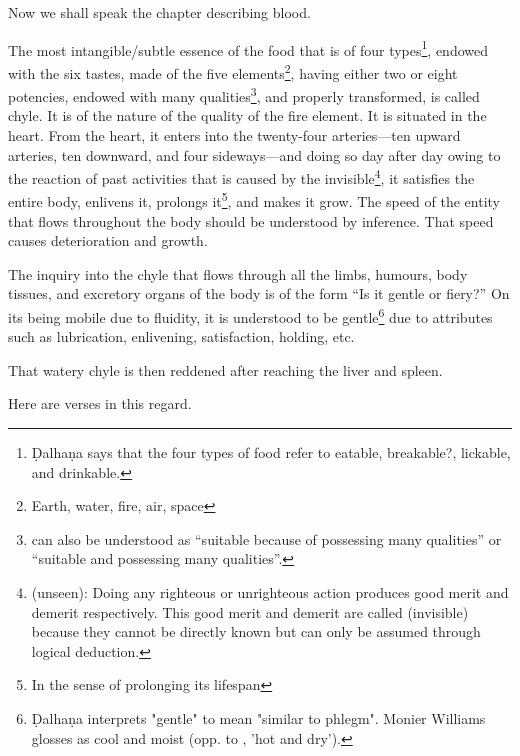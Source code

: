 \begin{translation}    
\item [1] Now we shall speak the chapter describing blood.

\item [2]

    
\item [3]    
    The most intangible/subtle essence of the food that is of four types\footnote{Ḍalhaṇa says that the four types of food refer to eatable, breakable?, lickable, and drinkable.}, endowed with the six tastes, made of the five elements\footnote{Earth, water, fire, air, space}, having either two or eight potencies, endowed with many qualities\footnote{ can also be understood as “suitable because of possessing many qualities” or “suitable and possessing many qualities”.}, and properly transformed, is called chyle. It is of the nature of the quality of the fire element. It is situated in the heart. From the heart, it enters into the twenty-four arteries—ten upward arteries, ten downward, and four sideways—and doing so day after day owing to the reaction of past activities that is caused by the invisible\footnote{ (unseen): Doing any righteous or unrighteous action produces good merit and demerit respectively. This good merit and demerit are called  (invisible) because they cannot be directly known but can only be assumed through logical deduction.}, it satisfies the entire body, enlivens it, prolongs it\footnote{In the sense of prolonging its lifespan}, and makes it grow. The speed of the entity that flows throughout the body should be understood by inference. That speed causes deterioration and growth. 
    
    The inquiry into the chyle that flows through all the limbs, humours, body tissues, and excretory organs of the body is of the form “Is it gentle or fiery?” On its being mobile due to fluidity, it is understood to be gentle\footnote{Ḍalhaṇa interprets "gentle" to mean "similar to phlegm". Monier Williams glosses  as cool and moist (opp. to , 'hot and dry').} due to attributes such as lubrication, enlivening, satisfaction, holding, etc. 
    
\item [4]  
That watery chyle is then reddened after reaching the liver and spleen.

\item [5]
Here are verses in this regard.


\end{translation}
